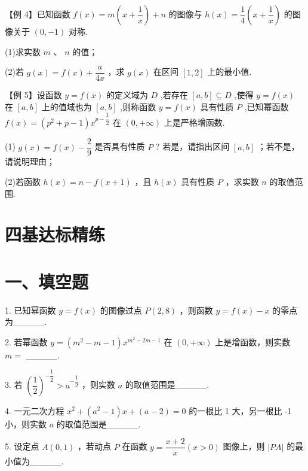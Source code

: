 【例 4】已知函数 $f\left( x\right)  = m\left( {x + \dfrac{1}{x}}\right)  + n$ 的图像与 $h\left( x\right)  = \dfrac{1}{4}\left( {x + \dfrac{1}{x}}\right)$ 的图像关于 $\left( {0, - 1}\right)$ 对称.

(1)求实数 $m$ 、 $n$ 的值；

(2)若 $g\left( x\right)  = f\left( x\right)  + \dfrac{a}{4x}$ ，求 $g\left( x\right)$ 在区间 $\left\lbrack  {1,2}\right\rbrack$ 上的最小值.

【例 5】设函数 $y = f\left( x\right)$ 的定义域为 $D$ ,若存在 $\left\lbrack  {a,b}\right\rbrack   \subseteq  D$ ,使得 $y = f\left( x\right)$ 在 $\left\lbrack  {a,b}\right\rbrack$ 上的值域也为 $\left\lbrack  {a,b}\right\rbrack$ ,则称函数 $y = f\left( x\right)$ 具有性质 $P$ ,已知幂函数 $f\left( x\right)  = \left( {{p}^{2} + p - 1}\right) {x}^{p - \dfrac{1}{2}}$ 在 $\left( {0, + \infty }\right)$ 上是严格增函数.

(1) $g\left( x\right)  = f\left( x\right)  - \dfrac{2}{9}$ 是否具有性质 $P$ ? 若是，请指出区间 $\left\lbrack  {a,b}\right\rbrack$ ；若不是，请说明理由；

(2)若函数 $h\left( x\right)  = n - f\left( {x + 1}\right)$ ，且 $h\left( x\right)$ 具有性质 $P$ ，求实数 $n$ 的取值范围.

\section*{四基达标精练}

\section*{一、填空题}

1. 已知幂函数 $y = f\left( x\right)$ 的图像过点 $P\left( {2,8}\right)$ ，则函数 $y = f\left( x\right)  - x$ 的零点为\_\_\_\_\_.

2. 若幂函数 $y = \left( {{m}^{2} - m - 1}\right) {x}^{{m}^{2} - {2m} - 1}$ 在 $\left( {0, + \infty }\right)$ 上是增函数，则实数 $m =$ \_\_\_\_\_.

3. 若 ${\left( \dfrac{1}{2}\right) }^{-\dfrac{1}{2}} > {a}^{-\dfrac{1}{2}}$ ，则实数 $a$ 的取值范围是\_\_\_\_\_.

4. 一元二次方程 ${x}^{2} + \left( {{a}^{2} - 1}\right) x + \left( {a - 2}\right)  = 0$ 的一根比 1 大，另一根比 -1 小，则实数 $a$ 的取值范围是\_\_\_\_\_.

5. 设定点 $A\left( {0,1}\right)$ ，若动点 $P$ 在函数 $y = \dfrac{x + 2}{x}\left( {x > 0}\right)$ 图像上，则 $\left| {PA}\right|$ 的最小值为\_\_\_\_\_.

